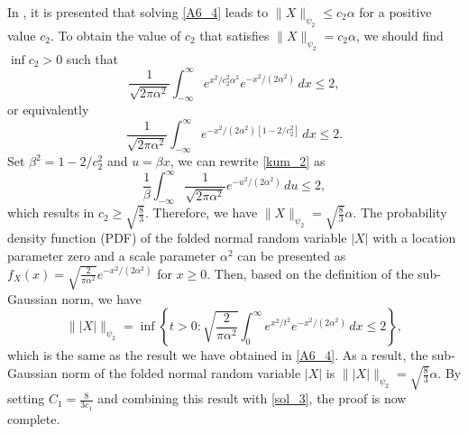 \documentclass[12pt,draftcls,onecolumn]{IEEEtran}
\begin{document}
In \cite[Page~28]{vershynin2018high}, it is presented that solving \eqref{A6_4} leads to $\|X\|_{\psi_2}\leq c_2\alpha$ for a positive value $c_2$. To obtain the value of $c_2$ that satisfies $\|X\|_{\psi_2}= c_2\alpha$, we should find $\inf c_2>0$ such that
\begin{equation}
\label{kum_1}
\frac{1}{\sqrt{2\pi\alpha^2}}\int_{-\infty}^{\infty}e^{x^2/c_2^2\alpha^2}e^{-x^2/(2\alpha^2)}\,dx\leq 2,
\end{equation}
or equivalently
\begin{equation}
\label{kum_2}
\frac{1}{\sqrt{2\pi\alpha^2}}\int_{-\infty}^{\infty}e^{-x^2/(2\alpha^2)\left[1-2/c_2^2\right]}\,dx\leq 2.
\end{equation}
Set $\beta^2=1-2/c_2^2$ and $u=\beta x$, we can rewrite \eqref{kum_2} as
\begin{equation}
\label{kum_3}
\frac{1}{\beta}\int_{-\infty}^{\infty}\frac{1}{\sqrt{2\pi\alpha^2}}e^{-u^2/(2\alpha^2)}\,du\leq 2,
\end{equation}
which results in $c_2\geq\sqrt{\frac{8}{3}}$. Therefore, we have $\|X\|_{\psi_2}=\sqrt{\frac{8}{3}}\alpha$. The probability density function (PDF) of the folded normal random variable $|X|$ with a location parameter zero and a scale parameter $\alpha^2$ can be presented as $f_{X}(x)=\sqrt{\frac{2}{\pi\alpha^2}}e^{-x^2/(2\alpha^2)}$ for $x\geq 0$. Then, based on the definition of the sub-Gaussian norm, we have
\begin{equation}
\label{A6_5}
\||X|\|_{\psi_2}=\inf \left\{t>0: \sqrt{\frac{2}{\pi\alpha^2}}\int_{0}^{\infty}e^{x^2/t^2}e^{-x^2/(2\alpha^2)}\,dx\leq 2\right\},
\end{equation}
which is the same as the result we have obtained in \eqref{A6_4}. As a result, the sub-Gaussian norm of the folded normal random variable $|X|$ is 
$\||X|\|_{\psi_2}=\sqrt{\frac{8}{3}}\alpha$. By setting $C_1=\frac{8}{3c_1}$ and combining this result %
with \eqref{sol_3}, the proof is now complete.

\end{document}
